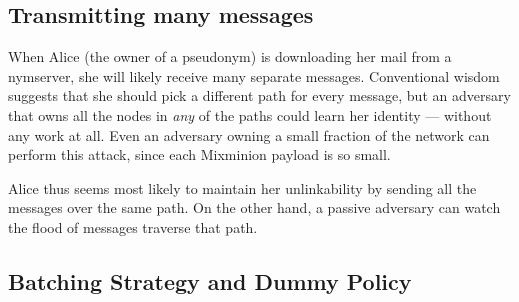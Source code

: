 \documentclass[11pt]{IEEEtran}
\begin{document}
\subsection{Transmitting many messages}

When Alice (the owner of a pseudonym) is downloading her mail from a
nymserver, she will likely receive many separate messages.
%
%
Conventional wisdom suggests that she should pick a different
path for every message, but an adversary that owns all the nodes in
\emph{any} of the paths could learn her identity --- without any work
at all. Even an adversary owning a small fraction of the network
can perform this attack, since each Mixminion payload is so small.


Alice thus seems most likely to maintain her unlinkability by sending all the
messages over the same path. On the other hand, a passive adversary can
watch the flood of messages traverse that path.



\subsection{Batching Strategy and Dummy Policy}
\label{subsec:batching}
\end{document}
